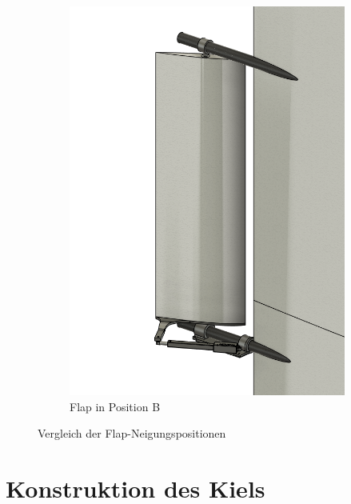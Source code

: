 \begin{figure}[H]
\begin{subfigure}[b]{0.28\linewidth}
        \includegraphics[width=\linewidth]{assets/flap_tilt_2.png}
        \caption{Flap in Position B}
        \label{fig:flaptilt2}
    \end{subfigure}
    \caption{Vergleich der Flap-Neigungspositionen}
    \label{fig:flaptilt_comparison}
\end{figure}


\section{Konstruktion des Kiels}

